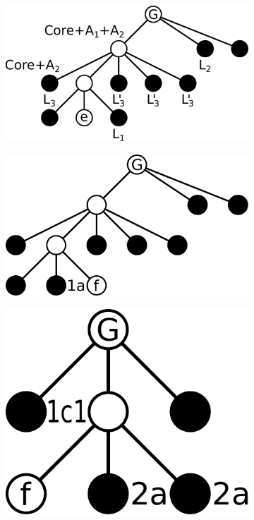 \begin{figure}
    \begin{subfigure}{0.3\linewidth}\centering
        \includegraphics[height=\myMinHeight]{../../img/svg/seq_proof_figs_a}
        \caption{}\label{fig:seq_proof:a}
    \end{subfigure}%
    \hfill
    \begin{subfigure}{0.3\linewidth}\centering
        \includegraphics[height=\myMinHeight]{../../img/svg/seq_proof_figs_b}
        \caption{}\label{fig:seq_proof:b}
    \end{subfigure}%
    \hfill
    \begin{subfigure}{0.3\linewidth}\centering
        \includegraphics[height=\myMinHeight]{../../img/svg/seq_proof_figs_c}
        \caption{}\label{fig:seq_proof:c}
    \end{subfigure}%


\end{figure}
